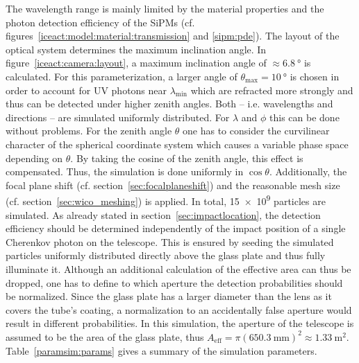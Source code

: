 The wavelength range is mainly limited by the material properties and the photon detection efficiency of the SiPMs (cf. figures~\ref{iceact:model:material:transmission} and \ref{sipm:pde}). The layout of the optical system determines the maximum inclination angle. In figure~\ref{iceact:camera:layout}, a maximum inclination angle of $\approx\SI{6.8}{\degree}$ is calculated. For this parameterization, a larger angle of $\theta_\text{max}=\SI{10}{\degree}$ is chosen in order to account for UV photons near $\lambda_\text{min}$ which are refracted more strongly and thus can be detected under higher zenith angles. Both -- i.e. wavelengths and directions -- are simulated uniformly distributed. For $\lambda$ and $\phi$ this can be done without problems. For the zenith angle $\theta$ one has to consider the curvilinear character of the spherical coordinate system which causes a variable phase space depending on $\theta$. By taking the cosine of the zenith angle, this effect is compensated. Thus, the simulation is done uniformly in $\cos{\theta}$. Additionally, the focal plane shift (cf. section~\ref{sec:focalplaneshift}) and the reasonable mesh size (cf. section~\ref{sec:wico_meshing}) is applied. In total, \num{15e9} particles are simulated. As already stated in section~\ref{sec:impactlocation}, the detection efficiency should be determined independently of the impact position of a single Cherenkov photon on the telescope. This is ensured by seeding the simulated particles uniformly distributed directly above the glass plate and thus fully illuminate it. Although an additional calculation of the effective area can thus be dropped, one has to define to which aperture the detection probabilities should be normalized. Since the glass plate has a larger diameter than the lens as it covers the tube's coating, a normalization to an accidentally false aperture would result in different probabilities. In this simulation, the aperture of the telescope is assumed to be the area of the glass plate, thus $A_\text{eff} = \pi(\SI{650.3}{\milli\meter})^2\approx\SI{1.33}{\meter\squared}$.
Table~\ref{paramsim:params} gives a summary of the simulation parameters.

